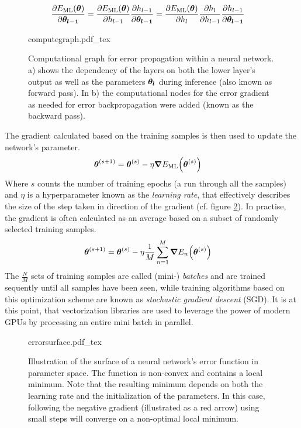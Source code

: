 \begin{align}
    \pdv{E_{\mathrm{ML}}\qty(\vb*{\theta})}{\vb*{\theta_{l-1}}} &= \pdv{E_{\mathrm{ML}}\qty(\vb*{\theta})}{h_{l-1}} \pdv{h_{l-1}}{\vb*{\theta_{l-1}}} = \pdv{E_{\mathrm{ML}}\qty(\vb*{\theta})}{h_l}\pdv{h_l}{h_{l-1}} \pdv{h_{l-1}}{\vb*{\theta_{l-1}}}
\end{align}
\begin{figure}
    \centering
\def\svgwidth{\textwidth}
{computegraph.pdf_tex}
\caption[Computational graph for error propagation]{Computational graph for error propagation within a neural network. a) shows the dependency of the layers on both the lower layer's output as well as the parameters $\vb*{\theta_l}$ during inference (also known as forward pass). In b) the computational nodes for the error gradient as needed for error backpropagation were added (known as the backward pass).}\label{fig:computegraph}
\end{figure}\noindent
The gradient calculated based on the training samples is then used to update the network's parameter.
\begin{align}
    \vb*{\theta}^{(s+1)} &= \vb*{\theta}^{(s)}-\eta \grad{E_{\mathrm{ML}}\qty(\vb*{\theta}^{(s)})}
\end{align}
Where $s$ counts the number of training epochs (a run through all the samples) and $\eta$ is a hyperparameter known as the \emph{learning rate}, that effectively describes the size of the step taken in direction of the gradient (cf. figure \ref{fig:errorsurf}). In practise, the gradient is often calculated as an average based on a subset of randomly selected training samples.
\begin{align}
    \vb*{\theta}^{(s+1)} &= \vb*{\theta}^{(s)}-\eta\frac{1}{M} \sum_{n=1}^M\grad{E_n\qty(\vb*{\theta}^{(s)})}
\end{align}
The $\frac{N}{M}$ sets of training samples are called (mini-) \emph{batches} and are trained sequently until all samples have been seen, while training algorithms based on this optimization scheme are known as \emph{stochastic gradient descent} (SGD). It is at this point, that vectorization libraries are used to leverage the power of modern GPUs by processing an entire mini batch in parallel.
\begin{figure}
    \centering
\def\svgwidth{.5\textwidth}
{errorsurface.pdf_tex}
\caption[Illustration of a neural network's error function]{Illustration of the surface of a neural network's error function in parameter space. The function is non-convex and contains a local minimum. Note that the resulting minimum depends on both the learning rate and the initialization of the parameters. In this case, following the negative gradient (illustrated as a red arrow) using small steps will converge on a non-optimal local minimum.}
\label{fig:errorsurf}
\end{figure}\noindent

